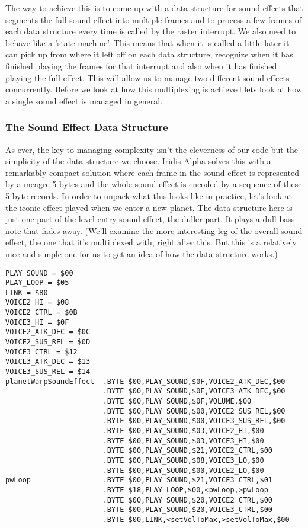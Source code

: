 The way to achieve this is to come up with a data structure for sound effects that segments the full sound effect
into multiple frames and to process a few frames of each data structure every time  is called
by the raster interrupt. We also need  to behave like a 'state machine'. This means that
when it is called a little later it can pick up from where it left off on each data structure, recognize
when it has finished playing the frames for that interrupt and also when it has finished playing the full effect. This
will allow us to manage two different sound effects concurrently. Before we look at how this multiplexing is achieved
lets look at how a single sound effect is managed in general.

\subsubsection{The Sound Effect Data Structure}
As ever, the key to managing complexity isn't the cleverness of our code but the simplicity of the data structure
we choose. Iridis Alpha solves this with a remarkably compact solution where each frame in the sound effect is represented
by a meagre 5 bytes and the whole sound effect is encoded by a sequence of these 5-byte records. In order to unpack
what this looks like in practice, let's look at the iconic effect played when we enter a new planet. The data structure
here is just one part of the level entry sound effect, the duller part. It plays a dull bass note that fades away. (We'll
examine the more interesting leg of the overall sound effect, the one that it's multiplexed with, right after this. But
this is a relatively nice and simple one for us to get an idea of how the data structure works.) 

\begin{lstlisting}
PLAY_SOUND = $00
PLAY_LOOP = $05
LINK = $80
VOICE2_HI = $08
VOICE2_CTRL = $0B
VOICE3_HI = $0F
VOICE2_ATK_DEC = $0C
VOICE2_SUS_REL = $0D
VOICE3_CTRL = $12
VOICE3_ATK_DEC = $13
VOICE3_SUS_REL = $14
planetWarpSoundEffect  .BYTE $00,PLAY_SOUND,$0F,VOICE2_ATK_DEC,$00
                       .BYTE $00,PLAY_SOUND,$0F,VOICE3_ATK_DEC,$00
                       .BYTE $00,PLAY_SOUND,$0F,VOLUME,$00
                       .BYTE $00,PLAY_SOUND,$00,VOICE2_SUS_REL,$00
                       .BYTE $00,PLAY_SOUND,$00,VOICE3_SUS_REL,$00
                       .BYTE $00,PLAY_SOUND,$03,VOICE2_HI,$00
                       .BYTE $00,PLAY_SOUND,$03,VOICE3_HI,$00
                       .BYTE $00,PLAY_SOUND,$21,VOICE2_CTRL,$00
                       .BYTE $00,PLAY_SOUND,$08,VOICE3_LO,$00
                       .BYTE $00,PLAY_SOUND,$00,VOICE2_LO,$00
pwLoop                 .BYTE $00,PLAY_SOUND,$21,VOICE3_CTRL,$01
                       .BYTE $18,PLAY_LOOP,$00,<pwLoop,>pwLoop
                       .BYTE $00,PLAY_SOUND,$20,VOICE2_CTRL,$00
                       .BYTE $00,PLAY_SOUND,$20,VOICE3_CTRL,$00
                       .BYTE $00,LINK,<setVolToMax,>setVolToMax,$00
\end{lstlisting}

